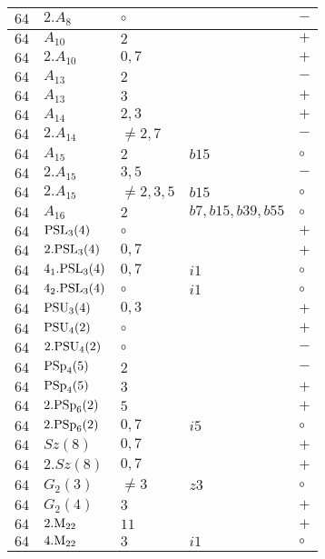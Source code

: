 \documentclass[a4paper, 11pt]{article}
\begin{document}
\begin{longtable}{lllll}
		$64$ & $2.A_{8}$ & $\circ$ &  & $-$ \\ \hline
		$64$ & $A_{10}$ & $2$ &  & $+$ \\ \hline
		$64$ & $2.A_{10}$ & $0,7$ &  & $+$ \\ \hline
		$64$ & $A_{13}$ & $2$ &  & $-$ \\ \hline
		$64$ & $A_{13}$ & $3$ &  & $+$ \\ \hline
		$64$ & $A_{14}$ & $2,3$ &  & $+$ \\ \hline
		$64$ & $2.A_{14}$ & $\neq 2,7$ &  & $-$ \\ \hline
		$64$ & $A_{15}$ & $2$ & $b15$ & $\circ$ \\ \hline
		$64$ & $2.A_{15}$ & $3, 5$ &  & $-$ \\ \hline
		$64$ & $2.A_{15}$ & $\neq 2,3,5$ & $b15$ & $\circ$ \\ \hline
		$64$ & $A_{16}$ & $2$ & $b7, b15, b39, b55$ & $\circ$ \\ \hline
		$64$ & ${\rm PSL}_{3}(4)$ & $\circ$ &  & $+$ \\ \hline
		$64$ & $2.{\rm PSL}_{3}(4)$ & $0,7$ &  & $+$ \\ \hline
		$64$ & $4_1.{\rm PSL}_{3}(4)$ & $0,7$ & $i1$ & $\circ$ \\ \hline
		$64$ & $4_2.{\rm PSL}_{3}(4)$ & $\circ$ & $i1$ & $\circ$ \\ \hline
		$64$ & ${\rm PSU}_{3}(4)$ & $0,3$ &  & $+$ \\ \hline
		$64$ & ${\rm PSU}_{4}(2)$ & $\circ$ &  & $+$ \\ \hline
		$64$ & $2.{\rm PSU}_{4}(2)$ & $\circ$ &  & $-$ \\ \hline
		$64$ & ${\rm PSp}_{4}(5)$ & $2$ &  & $-$ \\ \hline
		$64$ & ${\rm PSp}_{4}(5)$ & $3$ &  & $+$ \\ \hline
		$64$ & $2.{\rm PSp}_{6}(2)$ & $5$ &  & $+$ \\ \hline
		$64$ & $2.{\rm PSp}_{6}(2)$ & $0,7$ & $i5$ & $\circ$ \\ \hline
		$64$ & $Sz(8)$ & $0,7$ &  & $+$ \\ \hline
		$64$ & $2.Sz(8)$ & $0,7$ &  & $+$ \\ \hline
		$64$ & $G_{2}(3)$ & $\neq 3$ & $z3$ & $\circ$ \\ \hline
		$64$ & $G_{2}(4)$ & $3$ &  & $+$ \\ \hline
		$64$ & $2.{\rm M}_{22}$ & $11$ &  & $+$ \\ \hline
		$64$ & $4.{\rm M}_{22}$ & $3$ & $i1$ & $\circ$ \\ \hline

\end{longtable}
\end{document}
